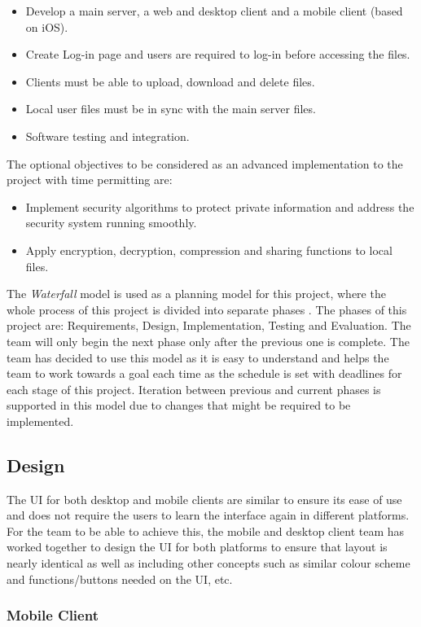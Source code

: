 \documentclass{article}
\begin{document}
\begin{itemize}
  \item Develop a main server, a web and desktop client and a mobile client (based on iOS).
  \item Create Log-in page and users are required to log-in before accessing the files.
  \item Clients must be able to upload, download and delete files.
  \item Local user files must be in sync with the main server files.
  \item Software testing and integration.
\end{itemize}
The optional objectives to be considered as an advanced implementation to the project with time permitting are:
\begin{itemize}
  \item Implement security algorithms to protect private information and address the security system running smoothly.
  \item Apply encryption, decryption, compression and sharing functions to local files.
\end{itemize}

The \emph{Waterfall} model is used as a planning model for this project, where the whole process of this project is divided into separate phases \cite{c3}. The phases of this project are: Requirements, Design, Implementation, Testing and Evaluation. The team will only begin the next phase only after the previous one is complete. The team has decided to use this model as it is easy to understand and helps the team to work towards a goal each time as the schedule is set with deadlines for each stage of this project. Iteration between previous and current phases is supported in this model due to changes that might be required to be implemented.

\subsection{Design}
The UI for both desktop and mobile clients are similar to ensure its ease of use and does not require the users to learn the interface again in different platforms. For the team to be able to achieve this, the mobile and desktop client team has worked together to design the UI for both platforms to ensure that layout is nearly identical as well as including other concepts such as similar colour scheme and functions/buttons needed on the UI, etc.

\subsubsection{Mobile Client}
\end{document}
